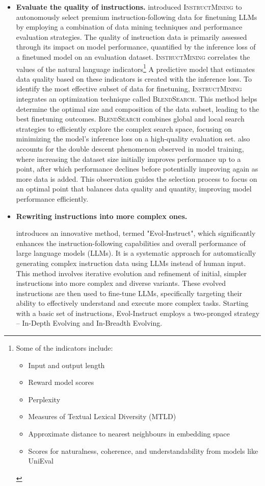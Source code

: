 \begin{itemize}
{	      }
	\item \textbf{Evaluate the quality of instructions.}{
		      \textcite{cao2023instruction} introduced \textsc{InstructMining} to autonomously select premium instruction-following data for finetuning LLMs by employing a combination of data mining techniques and performance evaluation strategies.
		      The quality of instruction data is primarily assessed through its impact on model performance, quantified by the inference loss of a finetuned model on an evaluation dataset. \textsc{InstructMining} correlates the values of the natural language indicators\footnote{Some of the indicators include:
			      \begin{itemize}
				      \item Input and output length
				      \item Reward model scores
				      \item Perplexity
				      \item Measures of Textual Lexical Diversity (MTLD)
				      \item Approximate distance to nearest neighbours in embedding space
				      \item Scores for naturalness, coherence, and understandability from models like UniEval
			      \end{itemize}
		      }
		      A predictive model that estimates data quality based on these indicators is created with the inference loss.
		      To identify the most effective subset of data for finetuning, \textsc{InstructMining} integrates an optimization technique called \textsc{BlendSearch}. This method helps determine the optimal size and composition of the data subset, leading to the best finetuning outcomes. \textsc{BlendSearch} combines global and local search strategies to efficiently explore the complex search space, focusing on minimizing the model’s inference loss on a high-quality evaluation set.
		      \textcite{cao2023instruction} also accounts for the double descent phenomenon observed in model training, where increasing the dataset size initially improves performance up to a point, after which performance declines before potentially improving again as more data is added. This observation guides the selection process to focus on an optimal point that balances data quality and quantity, improving model performance efficiently.
	      }
	\item \textbf{Rewriting instructions into more complex ones.} {
	      \textcite{xu2023wizardlm} introduces an innovative method, termed "Evol-Instruct", which significantly enhances the instruction-following capabilities and overall performance of large language models (LLMs). It is a systematic approach for automatically generating complex instruction data using LLMs instead of human input. This method involves iterative evolution and refinement of initial, simpler instructions into more complex and diverse variants. These evolved instructions are then used to fine-tune LLMs, specifically targeting their ability to effectively understand and execute more complex tasks. Starting with a basic set of instructions, Evol-Instruct employs a two-pronged strategy -- In-Depth Evolving and In-Breadth Evolving.

}
\end{itemize}
